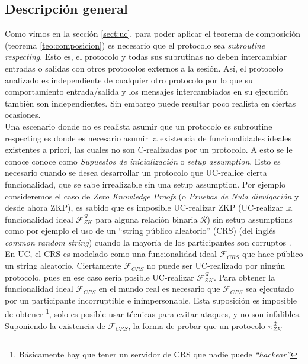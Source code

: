 \subsection{Descripción general}
\label{sect:dg_guc}

Como vimos en la sección \ref{sect:uc}, para poder aplicar el teorema de composición (teorema
\ref{teo:composicion}) es necesario que el protocolo sea \textit{subroutine respecting}.
Esto es, el protocolo y todas sus subrutinas no deben intercambiar entradas o salidas con otros
protocolos externos a la sesión. Así, el protocolo analizado es independiente de cualquier
otro protocolo por lo que su comportamiento entrada/salida y los mensajes intercambiados en su
ejecución también son independientes. Sin embargo puede resultar poco realista en ciertas ocasiones.\\
Una escenario donde no es realista asumir que un protocolo es subroutine respecting es donde
es necesario asumir la existencia de funcionalidades ideales existentes a priori, las cuales no son
C-realizadas por un protocolo. A esto se le conoce conoce como \textit{Supuestos de inicialización}
o \textit{setup assumption}.
Esto es necesario cuando se desea
desarrollar un protocolo que UC-realice cierta funcionalidad, que se sabe irrealizable sin una setup
assumption. Por ejemplo consideremos el caso de \textit{Zero Knowledge Proofs} (o \textit{Pruebas de
Nula divulgación} y desde ahora ZKP), es sabido que es imposible UC-realizar
ZKP (UC-realizar la funcionalidad ideal $\mathcal{F}_{ZK}^\mathcal{R}$ para alguna relación binaria
$\mathcal{R}$) sin setup assumptions como por ejemplo el uso de un ``string público
aleatorio'' (CRS) (del inglés \textit{common random string}) cuando la mayoría de los participantes
son corruptos \cite{CanKusLin06}.\\
En UC, el CRS es modelado como una funcionalidad ideal $\mathcal{F}_{CRS}$ que hace público un string
aleatorio. Ciertamente $\mathcal{F}_{CRS}$ no puede ser UC-realizado por ningún protocolo, pues
en ese caso sería posible UC-realizar $\mathcal{F}_{ZK}^\mathcal{R}$. Para obtener la funcionalidad ideal
$\mathcal{F}_{CRS}$ en el mundo real es necesario que $\mathcal{F}_{CRS}$ sea ejecutado por un participante
incorruptible e inimpersonable. Esta suposición es imposible de obtener
\footnote{Básicamente hay que tener un servidor de CRS que nadie puede \textit{``hackear''}},
solo es posible usar técnicas para evitar ataques, y no son infalibles.\\
Suponiendo la existencia de $\mathcal{F}_{CRS}$, la forma de probar que un protocolo $\pi_{ZK}^\mathcal{R}$
